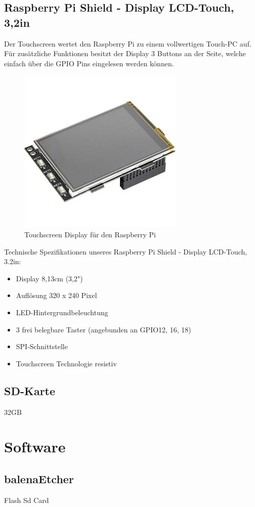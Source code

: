 \documentclass[a4paper,11pt,singlespacing]{article}
\begin{document}
			\subsection{Raspberry Pi Shield - Display LCD-Touch, 3,2in}
				Der Touchscreen wertet den Raspberry Pi zu einem vollwertigen Touch-PC auf. Für zusätzliche Funktionen besitzt der Display 3 Buttons an der Seite, welche einfach über die GPIO Pins eingelesen werden können.
				\begin{figure}[ht]
					\centering
					\includegraphics[scale=0.5]{touch_display}
					\caption{Touchscreen Display für den Raspberry Pi}
					\label{touchdisplay}
				\end{figure}
				Technische Spezifikationen unseres Raspberry Pi Shield - Display LCD-Touch, 3.2in:
				\begin{itemize}
					\item Display 8,13cm (3,2")
					\item Auflösung 320 x 240 Pixel
					\item LED-Hintergrundbeleuchtung
					\item 3 frei belegbare Taster (angebunden an GPIO12, 16, 18)
					\item SPI-Schnittstelle
					\item Touchscreen Technologie resistiv
				\end{itemize}
		\subsection{SD-Karte}
    			32GB
    			
    	\section{Software}
    		\subsection{balenaEtcher}
    			Flash Sd Card
\end{document}
